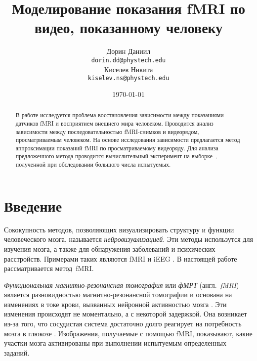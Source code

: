 \documentclass[a4paper, 12pt]{article}
\title{Моделирование показания fMRI по видео, показанному человеку}
\author{
	Дорин Даниил \\
	\texttt{dorin.dd@phystech.edu} \\
	\And
	Киселев Никита \\
	\texttt{kiselev.ns@phystech.edu} \\
}
\date{\today}
\begin{document}
\maketitle

\begin{abstract}
	
	В работе исследуется проблема восстановления зависимости между показаниями датчиков fMRI
	и восприятием внешнего мира человеком.
	Проводится анализ зависимости между последовательностью fMRI-снимков и видеорядом,
	просматриваемым человеком.
	На основе исследования зависимости предлагается метод аппроксимации показаний fMRI по
	просматриваемому видеоряду.
	Для анализа предложенного метода проводится вычислительный эксперимент на 
	выборке~\citep{Berezutskaya2022}, полученной при обследовании большого числа испытуемых.

\end{abstract}



\section{Введение}

	Сококупность методов, позволяющих визуализировать структуру и функции человеческого мозга,
	называется \textit{нейровизуализацией}. Эти методы использутся для изучения мозга, а также
	для обнаружения заболеваний и психических расстройств. 
	Примерами таких являются fMRI и iEEG \citep{Berezutskaya2022}.
	В настоящей работе рассматривается метод~fMRI.

	\textit{Функциональная магнитно-резонансная томография} или \textit{фМРТ} (англ.~\textit{fMRI}) 
	является разновидностью магнитно-резонансной томографии и основана на изменениях в токе крови, 
	вызванных нейронной активностью мозга \citep{Glover2011}. 
	Эти изменения происходят не моментально, а с некоторой задержкой.
	Она возникает из-за того, что сосудистая система достаточно долго реагирует 
	на потребность мозга в глюкозе \citep{Logothetis2003}. Изображения, получаемые с помощью fMRI,
	показывают, какие участки мозга активированы при выполнении испытуемым определенных заданий.
\end{document}
